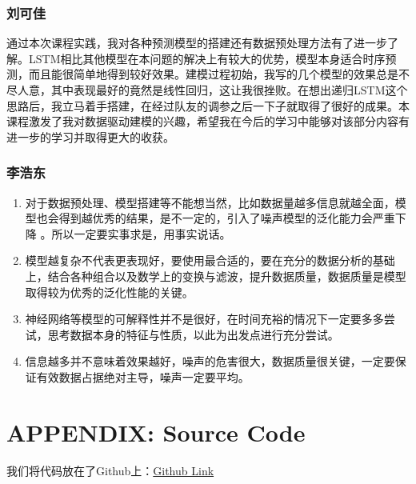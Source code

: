 \documentclass[11pt,a4paper]{elegantpaper}
\begin{document}
\begin{multicols}{2}
\subsubsection{刘可佳}
通过本次课程实践，我对各种预测模型的搭建还有数据预处理方法有了进一步了解。LSTM相比其他模型在本问题的解决上有较大的优势，模型本身适合时序预测，而且能很简单地得到较好效果。建模过程初始，我写的几个模型的效果总是不尽人意，其中表现最好的竟然是线性回归，这让我很挫败。在想出递归LSTM这个思路后，我立马着手搭建，在经过队友的调参之后一下子就取得了很好的成果。本课程激发了我对数据驱动建模的兴趣，希望我在今后的学习中能够对该部分内容有进一步的学习并取得更大的收获。

\subsubsection{李浩东}

\begin{enumerate}
  \item 对于数据预处理、模型搭建等不能想当然，比如数据量越多信息就越全面，模型也会得到越优秀的结果，是不一定的，引入了噪声模型的泛化能力会严重下降
  。所以一定要实事求是，用事实说话。
  \item 模型越复杂不代表更表现好，要使用最合适的，要在充分的数据分析的基础上，结合各种组合以及数学上的变换与滤波，提升数据质量，数据质量是模型取得较为优秀的泛化性能的关键。
  \item 神经网络等模型的可解释性并不是很好，在时间充裕的情况下一定要多多尝试，思考数据本身的特征与性质，以此为出发点进行充分尝试。
  \item 信息越多并不意味着效果越好，噪声的危害很大，数据质量很关键，一定要保证有效数据占据绝对主导，噪声一定要平均。
\end{enumerate}

\section{APPENDIX: Source Code}

我们将代码放在了Github上：\href{https://github.com/LeBronLiHD/ZJU2021_Data-driven_Modeling_Application}{Github Link}

\nocite{*}

\end{multicols}
\end{document}
